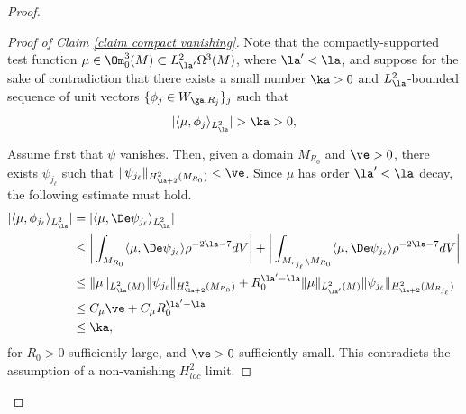 \documentclass[hidelinks, 12pt, oneside, reqno]{amsart}
\begin{document}
\begin{proof}
    \begin{proof}[Proof of Claim \ref{claim compact vanishing}]
    Note that the compactly-supported test function $\mu \in \Om^3_0(M) \subset L^2_{\la'}\Omega^3(M)$, where $\la' < \la$, and suppose for the sake of contradiction that there exists a small number $\ka >0$ and $L^2_\la$-bounded sequence of unit vectors $\{\phi_j \in W_{\ga, R_j} \}_j$  such that 
    \[
    |\langle \mu, \phi_j \rangle_{L^2_\la}| > \ka >0,
    \]
    
    Assume first that $\psi$ vanishes. Then, given a domain $M_{R_0}$ and $\ve >0$, there exists $\psi_{j_\ell}$ such that $\|\psi_{j_\ell}\|_{H^2_{\la+2}(M_{R_0})} < \ve$. Since $\mu$ has order $\la' < \la$ decay, the following estimate must hold.
    \begin{align*}
        |\langle \mu, \phi_{j_\ell} \rangle_{L^2_\la} | &= |\langle \mu, \De \psi_{j_\ell} \rangle_{L^2_\la} | \\
        &\le \bigg| \int_{M_{R_0} } \langle \mu, \De \psi_{j_\ell} \rangle \rho^{-2\la - 7} dV \bigg| + \bigg| \int_{ M_{r_{j_\ell}} \setminus M_{R_0} } \langle \mu, \De \psi_{j_\ell} \rangle \rho^{-2\la - 7} dV \bigg| \\
        &\le \|\mu\|_{L^2_{\la}(M)} \|\psi_{j_\ell}\|_{H^2_{\la+2}(M_{R_0})} + R_0^{\la' -\la}\|\mu\|_{L^2_{\la'}(M)}\|\psi_{j_\ell}\|_{H^2_{\la + 2}(M_{R_{j_\ell}})}\\
        &\le C_{\mu}\ve + C_{\mu}R_0^{\la'-\la}\\
        &\le \ka,
    \end{align*}
    for $R_0 >0$ sufficiently large, and $\ve >0$ sufficiently small. This contradicts the assumption of a non-vanishing $H^2_{loc}$ limit.  
    

\end{proof}
\end{proof}
\end{document}
